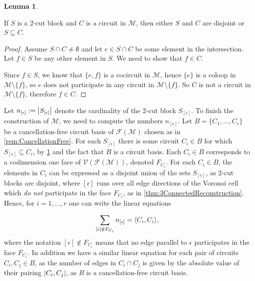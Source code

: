 \documentclass[12pt]{report}
\theoremstyle{definition}
\newtheorem{lemma}[theorem]{Lemma}
\DeclarePairedDelimiter\abs{\lvert}{\rvert}
\DeclarePairedDelimiter\iprod{\langle}{\rangle}
\def\calF{\mathcal F}
\def\calM{\mathcal M}
\def\calV{\mathcal V}
\theoremstyle{upright}
\begin{document}
\begin{lemma}\label{lem:CircuitBlocks}

    If $S$ is a 2-cut block and $C$ is a circuit in $\calM$, then either $S$ and $C$ are disjoint or $S\subseteq C$.
    
\end{lemma}

\begin{proof}

    Assume $S\cap C\neq\emptyset$ and let $e\in S\cap C$ be some element in the intersection.
    Let $f\in S$ be any other element in $S$.
    We need to show that $f\in C$.

    Since $f\in S$, we know that $\{e, f\}$ is a cocircuit in $\calM$, hence $\{e\}$ is a coloop in $\calM\setminus\{f\}$, so $e$ does not participate in any circuit in $\calM\setminus\{f\}$.
    So $C$ is not a circuit in $\calM\setminus\{f\}$, therefore $f\in C$.
    
\end{proof}

Let $n_{[\epsilon]}:=\abs*{S_{[\epsilon]}}$ denote the cardinality of the 2-cut block $S_{[\epsilon]}$.
To finish the construction of $\calM$, we need to compute the numbers $n_{[\epsilon]}$.
Let $B=\{C_1, \dots, C_r\}$ be a cancellation-free circuit basis of $\calF(\calM)$ chosen as in \cref{rem:CancellationFree}.
For each $S_{[\epsilon]}$ there is some circuit $C_i\in B$ for which $S_{[\epsilon]}\subseteq C_i$, by \cref{lem:CircuitBlocks} and the fact that $B$ is a circuit basis.
Each $C_i\in B$ corresponds to a codimension one face of $\calV(\calF(\calM))$, denoted $F_{C_i}$.
For each $C_i\in B$, the elements in $C_i$ can be expressed as a disjoint union of the sets $S_{[\epsilon]}$, as 2-cut blocks are disjoint, where $[\epsilon]$ runs over all edge directions of the Voronoi cell which \textit{do not} participate in the face $F_{C_i}$, as in \cref{thm:3ConnectedReconstruction}.
Hence, for $i=1, \dots, r$ one can write the linear equations

\begin{equation}\label{eq:CircuitPairing}
    \sum_{[\epsilon]\not\in F_{C_i}} n_{[\epsilon]}=\iprod*{C_i, C_i},
\end{equation}
where the notation $[\epsilon]\not\in F_{C_i}$ means that no edge parallel to $\epsilon$ participates in the face $F_{C_i}$.
In addition we have a similar linear equation for each pair of circuits $C_i, C_j\in B$, as the number of edges in $C_i\cap C_j$ is given by the absolute value of their pairing $\abs*{C_i, C_j}$, as $B$ is a cancellation-free circuit basis.
\end{document}

